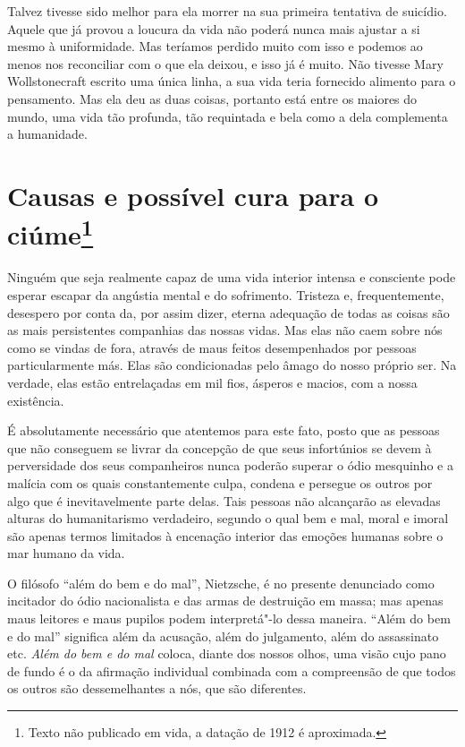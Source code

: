 Talvez tivesse sido melhor para ela morrer na sua primeira tentativa
de suicídio. Aquele que já provou a loucura da vida não poderá nunca mais
ajustar a si mesmo à uniformidade. Mas teríamos perdido muito com isso e
podemos ao menos nos reconciliar com o que ela deixou, e isso já é
muito. Não tivesse Mary Wollstonecraft escrito uma única linha, a sua
vida teria fornecido alimento para o pensamento. Mas ela deu as duas
coisas, portanto está entre os maiores do mundo, uma vida tão profunda,
tão requintada e bela como a dela complementa a humanidade.

\chapter{Causas e possível cura para o ciúme\footnote[*]{Texto não publicado em
  vida, a datação de 1912 é aproximada.}}

Ninguém que seja realmente capaz de uma vida interior intensa e
consciente pode esperar escapar da angústia mental e do sofrimento.
Tristeza e, frequentemente, desespero por conta da, por assim dizer, eterna
adequação de todas as coisas são as mais persistentes companhias das
nossas vidas. Mas elas não caem sobre nós como se vindas de fora,
através de maus feitos desempenhados por pessoas particularmente más.
Elas são condicionadas pelo âmago do nosso próprio ser. Na verdade, elas
estão entrelaçadas em mil fios, ásperos e macios, com a nossa
existência.

É absolutamente necessário que atentemos para este fato, posto que as
pessoas que não conseguem se livrar da concepção de que seus infortúnios
se devem à perversidade dos seus companheiros nunca poderão superar o
ódio mesquinho e a malícia com os quais constantemente culpa, condena e
persegue os outros por algo que é inevitavelmente parte delas. Tais
pessoas não alcançarão as elevadas alturas do humanitarismo verdadeiro,
segundo o qual bem e mal, moral e imoral são apenas termos limitados à
encenação interior das emoções humanas sobre o mar humano da vida.

O filósofo ``além do bem e do mal'', Nietzsche, é no presente denunciado
como incitador do ódio nacionalista e das armas de destruição em massa;
mas apenas maus leitores e maus pupilos podem interpretá"-lo dessa
maneira. ``Além do bem e do mal'' significa além da acusação, além do
julgamento, além do assassinato etc. \emph{Além do bem e do mal} coloca, diante dos nossos olhos, uma visão cujo pano de fundo é o da afirmação
individual combinada com a compreensão de que todos os outros são
dessemelhantes a nós, que são diferentes.

